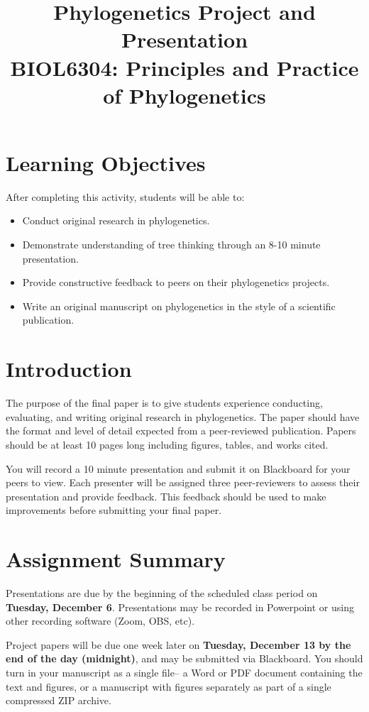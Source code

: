 \documentclass[12pt]{article}
\title{Phylogenetics Project and Presentation\\ \large BIOL6304: Principles and Practice of Phylogenetics }
\begin{document}
\maketitle

\section{Learning Objectives}

After completing this activity, students will be able to:

\begin{itemize}
\item Conduct original research in phylogenetics.
\item Demonstrate understanding of tree thinking through an 8-10 minute presentation.
\item Provide constructive feedback to peers on their phylogenetics projects.
\item Write an original manuscript on phylogenetics in the style of a scientific publication.
\end{itemize}

\section{Introduction}

The purpose of the final paper is to give students experience conducting, evaluating, and writing original research in phylogenetics.
The paper should have the format and level of detail expected from a peer-reviewed publication.
Papers should be at least 10 pages long including figures, tables, and works cited.

You will record a 10 minute presentation and submit it on Blackboard for your peers to view.
Each presenter will be assigned three peer-reviewers to assess their presentation and provide feedback.
This feedback should be used to make improvements before submitting your final paper.


\section{Assignment Summary}

Presentations are due by the beginning of the scheduled class period on \textbf{Tuesday, December 6}.
Presentations may be recorded in Powerpoint or using other recording software (Zoom, OBS, etc).

Project papers will be due one week later on \textbf{Tuesday, December 13 by the end of the day (midnight)}, and may be submitted via Blackboard.
You should turn in your manuscript as a single file-- a Word or PDF document containing the text and figures, or a manuscript with figures separately as part of a single compressed ZIP archive.
\end{document}
